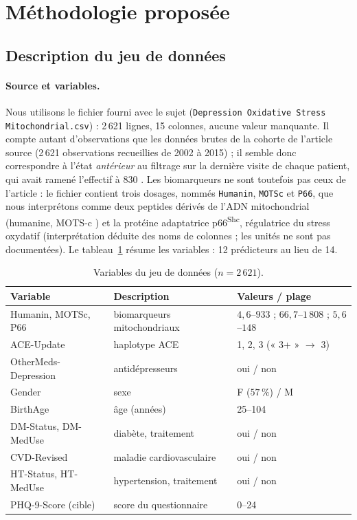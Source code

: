 \section{Méthodologie proposée}

\subsection{Description du jeu de données}
\paragraph{Source et variables.} Nous utilisons le fichier fourni avec le sujet (\texttt{Depression Oxidative Stress Mitochondrial.csv}) : 2\,621 lignes, 15 colonnes, aucune valeur manquante. Il compte autant d'observations que les données brutes de la cohorte de l'article source (2\,621 observations recueillies de 2002 à 2015) ; il semble donc correspondre à l'état \emph{antérieur} au filtrage sur la dernière visite de chaque patient, qui avait ramené l'effectif à 830 \cite{bader2024}. Les biomarqueurs ne sont toutefois pas ceux de l'article : le fichier contient trois dosages, nommés \texttt{Humanin}, \texttt{MOTSc} et \texttt{P66}, que nous interprétons comme deux peptides dérivés de l'ADN mitochondrial (humanine, MOTS-c \cite{lee2015}) et la protéine adaptatrice p66\textsuperscript{Shc}, régulatrice du stress oxydatif \cite{migliaccio1999} (interprétation déduite des noms de colonnes ; les unités ne sont pas documentées). Le tableau~\ref{tab:vars} résume les variables : 12 prédicteurs au lieu de 14.

\begin{table}[t]\centering\caption{Variables du jeu de données ($n=2\,621$).}\label{tab:vars}
\footnotesize
\begin{tabular}{@{}p{2.4cm}p{3.1cm}p{2.3cm}@{}}
\toprule Variable & Description & Valeurs / plage \\\midrule
Humanin, MOTSc, P66 & biomarqueurs mitochondriaux & $4{,}6$--$933$ ; $66{,}7$--$1\,808$ ; $5{,}6$--$148$ \\
ACE-Update & haplotype ACE & 1, 2, 3 (« 3+ » $\to$ 3) \\
OtherMeds-Depression & antidépresseurs & oui / non \\
Gender & sexe & F ($57$\,\%) / M \\
BirthAge & âge (années) & 25--104 \\
DM-Status, DM-MedUse & diabète, traitement & oui / non \\
CVD-Revised & maladie cardiovasculaire & oui / non \\
HT-Status, HT-MedUse & hypertension, traitement & oui / non \\\midrule
PHQ-9-Score (cible) & score du questionnaire & 0--24 \\
\bottomrule\end{tabular}
\end{table}

